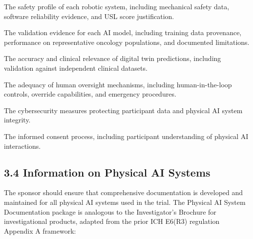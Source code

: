 \documentclass[11pt]{article}
\begin{document}
\begin{description}[leftmargin=2.5cm,style=sameline]

\item[(a)] The safety profile of each robotic system, including mechanical safety data, software reliability evidence, and USL score justification.

\item[(b)] The validation evidence for each AI model, including training data provenance, performance on representative oncology populations, and documented limitations.

\item[(c)] The accuracy and clinical relevance of digital twin predictions, including validation against independent clinical datasets.

\item[(d)] The adequacy of human oversight mechanisms, including human-in-the-loop controls, override capabilities, and emergency procedures.

\item[(e)] The cybersecurity measures protecting participant data and physical AI system integrity.

\item[(f)] The informed consent process, including participant understanding of physical AI interactions.

\end{description}

\subsection{3.4 Information on Physical AI Systems}

The sponsor should ensure that comprehensive documentation is developed and maintained for all physical AI systems used in the trial. The Physical AI System Documentation package is analogous to the Investigator's Brochure for investigational products, adapted from the prior ICH E6(R3) regulation Appendix A framework:
\end{document}
